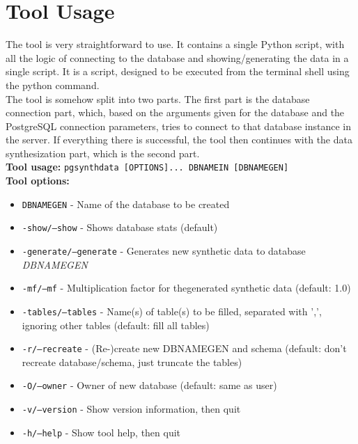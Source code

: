 \section{Tool Usage}
The tool is very straightforward to use. It contains a single Python script, with all the logic of connecting to the database and showing/generating the data in a single script. It is a script, designed to be executed from the terminal shell using the python command.\\
\newline
The tool is somehow split into two parts. The first part is the database connection part, which, based on the arguments given for the database and the PostgreSQL connection parameters, tries to connect to that database instance in the server. If everything there is successful, the tool then continues with the data synthesization part, which is the second part.\\
\newline
\textbf{Tool usage:} \newline
\texttt{pgsynthdata [OPTIONS]... DBNAMEIN [DBNAMEGEN]} \\
\newline
\textbf{Tool options:}
\begin{itemize}
\item \texttt{DBNAMEGEN} - Name of the database to be created
\item \texttt{-show/--show} - Shows database stats (default)
\item \texttt{-generate/--generate} - Generates new synthetic data to database \textit{DBNAMEGEN}
\item \texttt{-mf/--mf} - Multiplication factor for thegenerated synthetic data (default: 1.0)
\item \texttt{-tables/--tables} - Name(s) of table(s) to be filled, separated with ',', ignoring other tables (default: fill all tables)
\item \texttt{-r/--recreate} - (Re-)create new DBNAMEGEN and schema (default: don't recreate database/schema, just truncate the tables)
\item \texttt{-O/--owner} - Owner of new database (default: same as user)
\item \texttt{-v/--version} - Show version information, then quit
\item \texttt{-h/--help} - Show tool help, then quit
\newline
\end{itemize}
